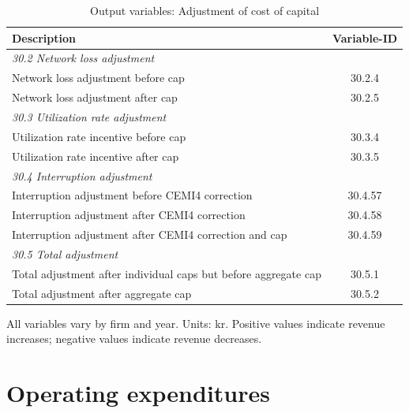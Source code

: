 \begin{table}[H]
\centering
\footnotesize
\begin{threeparttable}
\caption{Output variables: Adjustment of cost of capital}
\label{tab:wacc-adj-output-variables}
\begin{tabular}{@{}p{8cm}c@{}}
\toprule
\textbf{Description} & \textbf{Variable-ID} \\
\midrule
\multicolumn{2}{l}{\textit{30.2 Network loss adjustment}} \\
Network loss adjustment before cap & 30.2.4 \\
Network loss adjustment after cap & 30.2.5 \\
\midrule
\multicolumn{2}{l}{\textit{30.3 Utilization rate adjustment}} \\
Utilization rate incentive before cap & 30.3.4 \\
Utilization rate incentive after cap & 30.3.5 \\
\midrule
\multicolumn{2}{l}{\textit{30.4 Interruption adjustment}} \\
Interruption adjustment before CEMI4 correction & 30.4.57 \\
Interruption adjustment after CEMI4 correction & 30.4.58 \\
Interruption adjustment after CEMI4 correction and cap & 30.4.59 \\
\midrule
\multicolumn{2}{l}{\textit{30.5 Total adjustment}} \\
Total adjustment after individual caps but before aggregate cap & 30.5.1 \\
Total adjustment after aggregate cap & 30.5.2 \\
\bottomrule
\end{tabular}
\begin{tablenotes}
\item All variables vary by firm and year. Units: kr. Positive values indicate revenue increases; negative values indicate revenue decreases.
\end{tablenotes}
\end{threeparttable}
\end{table}


\section{Operating expenditures}

